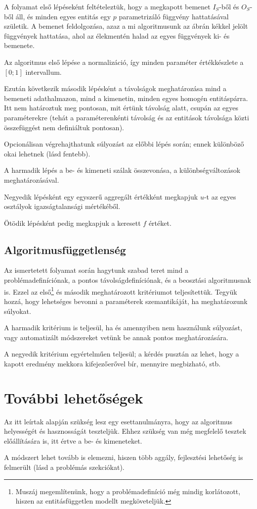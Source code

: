 \documentclass[twocolumn]{article}
\theoremstyle{definition}
\begin{document}
    A folyamat első lépéseként feltételeztük, hogy a megkapott bemenet $I_S$-ből és $O_S$-ből áll, és minden egyes entitás egy $p$ parametrizáló függvény hattatásával születik. A bemenet feldolgozása, azaz a mi algoritmusunk az ábrán kékkel jelölt függvények hattatása, ahol az élekmentén halad az egyes függvények ki- és bemenete.
    
    Az algoritmus első lépése a normalizáció, így minden paraméter értékkészlete a $[0; 1]$ intervallum.
    
    Ezután következik második lépésként a távolságok meghatározása mind a bemeneti adathalmazon, mind a kimenetin, minden egyes homogén entitáspárra. Itt nem határoztuk meg pontosan, mit értünk távolság alatt, csupán az egyes paraméterekre (tehát a paraméterenkénti távolság és az entitások távolsága közti összefüggést nem definiáltuk pontosan).
    
    Opcionálisan végrehajthatunk súlyozást az előbbi lépés során; ennek különböző okai lehetnek (lásd fentebb).
    
    A harmadik lépés a be- és kimeneti szálak összevonása, a különbségváltozások meghatározásával.
    
    Negyedik lépésként egy egyszerű aggregált értékként megkapjuk $u$-t az egyes osztályok igazságtalansági mértékéből.
    
    Ötödik lépésként pedig megkapjuk a keresett $f$ értéket.

    \subsection{Algoritmusfüggetlenség}
    
    Az ismertetett folyamat során hagytunk szabad teret mind a problémadefiníciónak, a pontos távolságdefiníciónak, és a beosztási algoritmusnak is. Ezzel az első\footnote{Muszáj megemlítenünk, hogy a problémadefiníció még mindig korlátozott, hiszen az entitásfüggetlen modellt megköveteljük.} és második meghatározott kritériumot teljesítettük. Tegyük hozzá, hogy lehetséges bevonni a paraméterek szemantikáját, ha meghatározunk súlyokat.
    
    A harmadik kritérium is teljesül, ha és amennyiben nem használunk súlyozást, vagy automatizált módszereket vetünk be annak pontos meghatározására.
    
    A negyedik kritérium egyértelműen teljesül; a kérdés pusztán az lehet, hogy a kapott eredmény mekkora kifejezőerővel bír, mennyire megbizható, stb.
    
\section{További lehetőségek}

    Az itt leírtak alapján szükség lesz egy esettanulmányra, hogy az algoritmus helyességét és hasznosságát teszteljük. Ehhez szükség van még megfelelő tesztek előállítására is, itt értve a be- és kimeneteket.
    
    A módszert lehet tovább is elemezni, hiszen több aggály, fejlesztési lehetőség is felmerült (lásd a problémás szekciókat).
    
\end{document}
